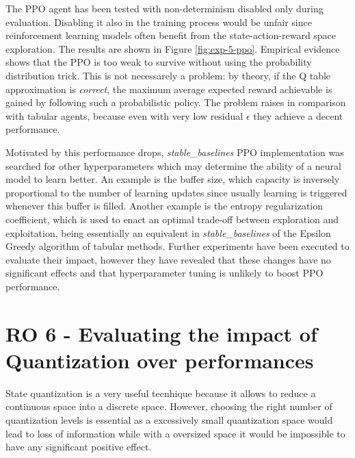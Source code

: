 The PPO agent has been tested with non-determinism disabled only during evaluation. Disabling it also in the training process would be unfair since reinforcement learning models often benefit from the state-action-reward space exploration. The results are shown in Figure \ref{fig:exp-5-ppo}. Empirical evidence shows that the PPO is too weak to survive without using the probability distribution trick. This is not necessarely a problem: by theory, if the Q table approximation is \textit{correct}, the maximum average expected reward achievable is gained by following such a probabilistic policy. The problem raises in comparison with tabular agents, because even with very low residual $\epsilon$ they achieve a decent performance.

Motivated by this performance drops, \textit{stable\_baselines} PPO implementation was searched for other hyperparameters which may determine the ability of a neural model to learn better.
An example is the buffer size, which capacity is inversely proportional to the number of learning updates since usually learning is triggered whenever this buffer is filled.
Another example is the entropy regularization coefficient, which is used to enact an optimal trade-off between exploration and exploitation, being essentially an equivalent in \textit{stable\_baselines} of the Epsilon Greedy algorithm of tabular methods.
Further experiments have been executed to evaluate their impact, however they have revealed that these changes have no significant effects and that hyperparameter tuning is unlikely to boost PPO performance.


\newpage
\section{RO 6 - Evaluating the impact of Quantization over performances}

State quantization is a very useful tecnhique because it allows to reduce a continuous space into a discrete space. However, choosing the right number of quantization levels is essential as a excessively small quantization space would lead to loss of information while with a oversized space it would be impossible to have any significant positive effect.

